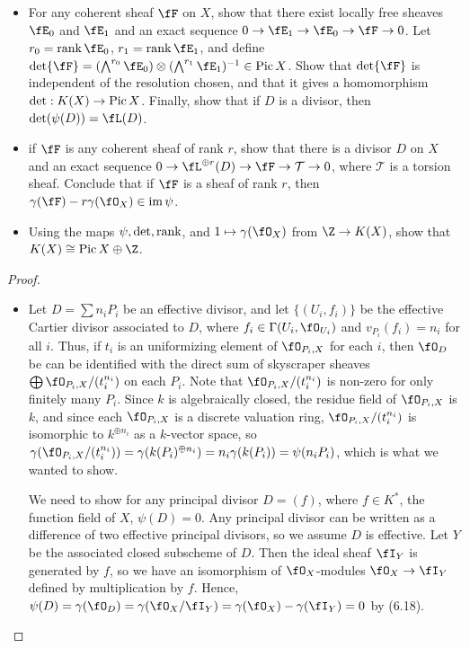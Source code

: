\documentclass[a4paper]{article}
\begin{document}
\begin{enumerate} [label=\textbf{\arabic*.}, leftmargin=0em]
\begin{itemize}
    \item[(b)] For any coherent sheaf $\fF$ on $X$, show that there exist locally free sheaves $\fE_0$ and $\fE_1$ and an exact sequence $0 \to \fE_1 \to \fE_0 \to \fF \to 0$. Let $r_0 = \rk \fE_0$, $r_1 = \rk \fE_1$, and define $\det \fF = (\bigwedge^{r_0} \fE_0) \otimes (\bigwedge^{r_1} \fE_1)^{-1} \in \pic X$. Show that $\det \fF$ is independent of the resolution chosen, and that it gives a homomorphism $\det : K(X) \to \operatorname{Pic} X$. Finally, show that if $D$ is a divisor, then $\det(\psi(D)) = \fL(D)$.

    \item[(c)] if $\fF$ is any coherent sheaf of rank $r$, show that there is a divisor $D$ on $X$ and an exact sequence $0 \to \fL^{\oplus r}(D) \to \fF \to \mathcal{T} \to 0$, where $\mathcal{T}$ is a torsion sheaf. Conclude that if $\fF$ is a sheaf of rank $r$, then $\gamma(\fF) - r \gamma(\fO_X) \in \im \psi$.

    \item[(d)] Using the maps $\psi, \det, \operatorname{rank}$, and $1 \mapsto \gamma(\fO_X)$ from $\Z \to K(X)$, show that $K(X) \cong \pic X \oplus \Z$. 
\end{itemize}

\begin{proof} $ $ \vspace{0pt}
\begin{itemize} [leftmargin=0cm]
\item[(a)] Let $D = \sum n_i P_i$ be an effective divisor, and let $\{ (U_i, f_i) \}$ be the effective Cartier divisor associated to $D$, where $f_i \in \Gamma(U_i, \fO_{U_i})$ and $v_{P_i}(f_i) = n_i$ for all $i$. Thus, if $t_i$ is an uniformizing element of $\fO_{P_i, X}$ for each $i$, then $\fO_D$ be can be identified with the direct sum of skyscraper sheaves $\bigoplus \fO_{P_i, X} / (t_i^{n_i})$ on each $P_i$. Note that $ \fO_{P_i, X} / (t_i^{n_i})$ is non-zero for only finitely many $P_i$. Since $k$ is algebraically closed, the residue field of $\fO_{P_i, X}$ is $k$, and since each $\fO_{P_i, X}$ is a discrete valuation ring, $\fO_{P_i, X} / (t_i^{n_i})$ is isomorphic to $k^{\oplus n_i}$ as a $k$-vector space, so $\gamma(\fO_{P_i, X}/(t_i^{n_i})) = \gamma(k(P_i)^{\oplus n_i}) = n_i \gamma(k(P_i)) = \psi(n_iP_i)$, which is what we wanted to show. 

We need to show for any principal divisor $D = (f)$, where $f \in K^*$, the function field of $X$, $\psi(D) = 0$. Any principal divisor can be written as a difference of two effective principal divisors, so we assume $D$ is effective. Let $Y$ be the associated closed subscheme of $D$. Then the ideal sheaf $\fI_Y$ is generated by $f$, so we have an isomorphism of $\fO_X$-modules $\fO_X \to \fI_Y$ defined by multiplication by $f$. Hence, $\psi(D) = \gamma(\fO_D) = \gamma(\fO_X / \fI_Y) = \gamma(\fO_X) - \gamma(\fI_Y) = 0$ by (6.18).


\end{itemize}
\end{proof}
\end{enumerate}
\end{document}

